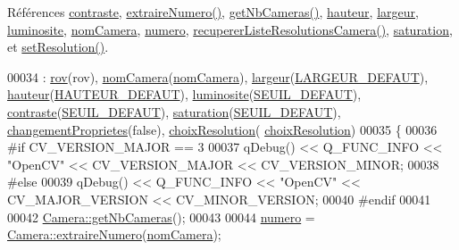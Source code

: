 Références \hyperlink{camera_8h_source_l00068}{contraste}, \hyperlink{camera_8cpp_source_l00276}{extraire\+Numero()}, \hyperlink{camera_8cpp_source_l00270}{get\+Nb\+Cameras()}, \hyperlink{camera_8h_source_l00066}{hauteur}, \hyperlink{camera_8h_source_l00065}{largeur}, \hyperlink{camera_8h_source_l00067}{luminosite}, \hyperlink{camera_8h_source_l00063}{nom\+Camera}, \hyperlink{camera_8h_source_l00064}{numero}, \hyperlink{camera_8cpp_source_l00133}{recuperer\+Liste\+Resolutions\+Camera()}, \hyperlink{camera_8h_source_l00069}{saturation}, et \hyperlink{camera_8cpp_source_l00186}{set\+Resolution()}.


\begin{DoxyCode}
00034                                                               : \hyperlink{class_camera_ad1dde4d981877001281af01c392307f1}{rov}(rov), 
      \hyperlink{class_camera_ac1cdaf82921d2a2f3f941d867718eba2}{nomCamera}(\hyperlink{class_camera_ac1cdaf82921d2a2f3f941d867718eba2}{nomCamera}), \hyperlink{class_camera_ad64f26cdfc5aa561208b273d430938cf}{largeur}(\hyperlink{camera_8h_afe66edd1ec0aa05058aaa2a069248f65}{LARGEUR\_DEFAUT}), 
      \hyperlink{class_camera_a5d89d7f9d1a5eab4175dd168c7fbf1c7}{hauteur}(\hyperlink{camera_8h_a70cf269dc21e5a921c2927034d6cadd2}{HAUTEUR\_DEFAUT}), \hyperlink{class_camera_aca5433bf19773161142d73009469b1ed}{luminosite}(\hyperlink{camera_8h_ae340bfbdd3eec3bbbea7d39d91c8aa91}{SEUIL\_DEFAUT}), 
      \hyperlink{class_camera_ad3b300e52c91341d985d3b54f562a0f7}{contraste}(\hyperlink{camera_8h_ae340bfbdd3eec3bbbea7d39d91c8aa91}{SEUIL\_DEFAUT}), \hyperlink{class_camera_afd46d6d2451ee33b68dbc74713f2687c}{saturation}(\hyperlink{camera_8h_ae340bfbdd3eec3bbbea7d39d91c8aa91}{SEUIL\_DEFAUT}), 
      \hyperlink{class_camera_a50d2b3ef5c08f8b61bbe2115d71005bd}{changementProprietes}(\textcolor{keyword}{false}), \hyperlink{class_camera_a3fdddf6f548f04d7bdc26f32602a03d4}{choixResolution}(
      \hyperlink{class_camera_a3fdddf6f548f04d7bdc26f32602a03d4}{choixResolution})
00035 \{
00036 \textcolor{preprocessor}{    #if CV\_VERSION\_MAJOR == 3}
00037     qDebug() << Q\_FUNC\_INFO << \textcolor{stringliteral}{"OpenCV"} << CV\_VERSION\_MAJOR << CV\_VERSION\_MINOR;
00038 \textcolor{preprocessor}{    #else}
00039     qDebug() << Q\_FUNC\_INFO << \textcolor{stringliteral}{"OpenCV"} << CV\_MAJOR\_VERSION << CV\_MINOR\_VERSION;
00040 \textcolor{preprocessor}{    #endif}
00041 
00042     \hyperlink{class_camera_a116b3869ff0647c851715605a1938a3c}{Camera::getNbCameras}();
00043 
00044     \hyperlink{class_camera_ae5cda5df3c9c49b88fff15389a1bbc64}{numero} = \hyperlink{class_camera_aa3fdc8b3feac7074911b472c4edb9dec}{Camera::extraireNumero}(\hyperlink{class_camera_ac1cdaf82921d2a2f3f941d867718eba2}{nomCamera});

\end{DoxyCode}
